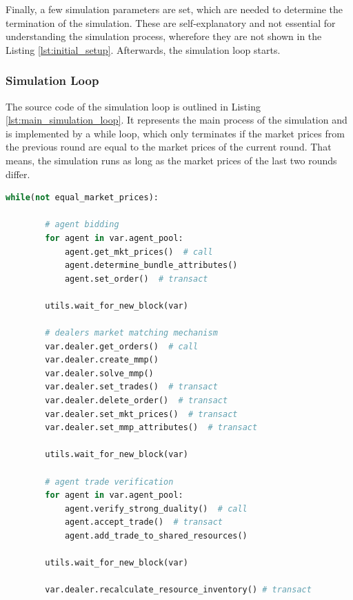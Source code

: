 Finally, a few simulation parameters are set, which are needed to determine the termination of the simulation.
These are self-explanatory and not essential for understanding the simulation process, wherefore they are not shown in the Listing \ref{lst:initial_setup}.
Afterwards, the simulation loop starts.

\subsubsection{Simulation Loop}
The source code of the simulation loop is outlined in Listing \ref{lst:main_simulation_loop}.
It represents the main process of the simulation and is implemented
by a while loop, which only terminates if the 
market prices from the previous round are equal to the market prices of the current round.
That means, the simulation runs as long as the market prices of the last two rounds differ.

\begin{lstlisting}[float=htbp, label=lst:main_simulation_loop, caption=Main Simulation Loop, language=Python]
    while(not equal_market_prices):
        
        # agent bidding
        for agent in var.agent_pool:
            agent.get_mkt_prices()  # call
            agent.determine_bundle_attributes()
            agent.set_order()  # transact

        utils.wait_for_new_block(var)

        # dealers market matching mechanism
        var.dealer.get_orders()  # call
        var.dealer.create_mmp()
        var.dealer.solve_mmp()
        var.dealer.set_trades()  # transact
        var.dealer.delete_order()  # transact
        var.dealer.set_mkt_prices()  # transact
        var.dealer.set_mmp_attributes()  # transact

        utils.wait_for_new_block(var)

        # agent trade verification
        for agent in var.agent_pool:
            agent.verify_strong_duality()  # call
            agent.accept_trade()  # transact
            agent.add_trade_to_shared_resources()

        utils.wait_for_new_block(var)

        var.dealer.recalculate_resource_inventory() # transact        
\end{lstlisting}

